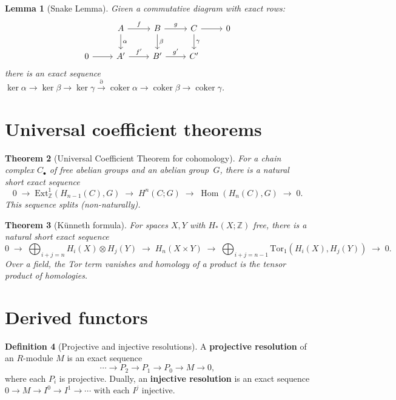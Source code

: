 \documentclass[12pt,a4paper,openany]{book}
\theoremstyle{definition}
\newtheorem{definition}{Definition}[chapter]
\theoremstyle{plain}
\newtheorem{theorem}[definition]{Theorem}
\newtheorem{lemma}[definition]{Lemma}
\theoremstyle{remark}
\newcommand{\Z}{\mathbb{Z}}
\DeclareMathOperator{\Hom}{Hom}
\DeclareMathOperator{\coker}{coker}
\begin{document}
\begin{lemma}[Snake Lemma]\label{lem:snake-lemma}
Given a commutative diagram with exact rows:
\[
\begin{tikzcd}
  & A \ar[r,"f"]\ar[d,"\alpha"]
  & B \ar[r,"g"]\ar[d,"\beta"]
  & C \ar[r]\ar[d,"\gamma"]
  & 0 \\
  0 \ar[r]
  & A' \ar[r,"f'"]
  & B' \ar[r,"g'"]
  & C'
\end{tikzcd}
\]
there is an exact sequence
$\ker\alpha\to\ker\beta\to\ker\gamma
\xrightarrow{\partial}\coker\alpha\to\coker\beta\to\coker\gamma$.
\end{lemma}

\section{Universal coefficient theorems}\label{sec:uct}

\begin{theorem}[Universal Coefficient Theorem for cohomology]
\label{thm:uct}
For a chain complex $C_\bullet$ of free abelian groups and an abelian
group~$G$, there is a natural short exact sequence
\[
  0 \;\to\;
  \mathrm{Ext}^1_\Z(H_{n-1}(C),G) \;\to\;
  H^n(C;G) \;\to\;
  \Hom(H_n(C),G) \;\to\; 0.
\]
This sequence splits (non-naturally).
\end{theorem}

\begin{theorem}[K\"unneth formula]
\label{thm:kunneth}
For spaces $X,Y$ with $H_*(X;\Z)$ free, there is a natural short exact
sequence
\[
  0 \;\to\;
  \bigoplus_{i+j=n}H_i(X)\otimes H_j(Y) \;\to\;
  H_n(X\times Y) \;\to\;
  \bigoplus_{i+j=n-1}\mathrm{Tor}_1(H_i(X),H_j(Y)) \;\to\; 0.
\]
Over a field, the Tor term vanishes and homology of a product is the
tensor product of homologies.
\end{theorem}

\section{Derived functors}\label{sec:derived-functors}

\begin{definition}[Projective and injective resolutions]
A \textbf{projective resolution} of an $R$-module $M$ is an exact
sequence
\[
  \cdots\to P_2\to P_1\to P_0\to M\to 0,
\]
where each $P_i$ is projective.
Dually, an \textbf{injective resolution} is an exact sequence
$0\to M\to I^0\to I^1\to\cdots$ with each $I^j$
injective.
\end{definition}
\end{document}

